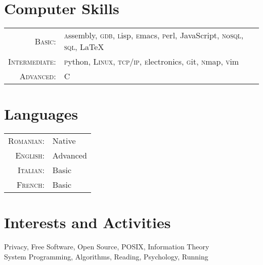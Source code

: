 \documentclass[a4paper,10pt]{article}
\begin{document}
\section{Computer Skills}
\begin{tabular}{rl}
\textsc{Basic:}&\textsc{a}ssembly, \textsc{gdb}, \textsc{l}isp, \textsc{e}macs, 
\textsc{p}erl, \textsc{J}ava\textsc{S}cript, 
\textsc{n}o\textsc{sql}, \textsc{sql}, \LaTeX\\
\textsc{Intermediate:}&\textsc{p}ython, 
\textsc{Linux}, \textsc{tcp/ip}, \textsc{e}lectronics, 
\textsc{g}it, \textsc{n}map, \textsc{v}im\\
\textsc{Advanced}:&\textsc{C}\\

\end{tabular}


\section{Languages}
\begin{tabular}{rl}
\textsc{Romanian:}&Native\\
\textsc{English:}&Advanced\\
\textsc{Italian:}&Basic\\
\textsc{French:}&Basic\\
\end{tabular}

\section{Interests and Activities}
Privacy, Free Software, Open Source, POSIX, Information Theory\\
System Programming, Algorithms, Reading, Psychology, Running\\
\end{document}

